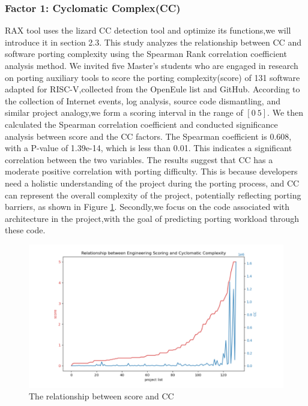 \documentclass[sigconf,screen,review,anonymous]{acmart}
\begin{document}
\subsubsection{Factor 1: Cyclomatic Complex(CC)}
RAX tool uses the lizard CC detection tool and optimize its functions,we will introduce it in section 2.3.
This study analyzes the relationship between CC and software porting complexity using the Spearman Rank correlation coefficient analysis method.
We invited five Master's students who are engaged in research on porting auxiliary tools to score the porting complexity(score) of 131 software adapted for RISC-V,collected from the OpenEule list and GitHub.
According to the collection of Internet events, log analysis, source code dismantling, and similar project analogy,we form a scoring interval in the range of $[0~5]$.
We then calculated the Spearman correlation coefficient and conducted significance analysis between score and the CC factors.
The Spearman coefficient is 0.608, with a P-value of 1.39e-14, which is less than 0.01.
This indicates a significant correlation between the two variables.
The results suggest that CC has a moderate positive correlation with porting difficulty.
This is because developers need a holistic understanding of the project during the porting process, and CC can represent the overall complexity of the project, potentially reflecting porting barriers, as shown in Figure \ref{fig:relationship}.
Secondly,we focus on the code associated with architecture in the project,with the goal of predicting porting workload through these code.

\begin{figure}
  \centering
  \includegraphics[width=\linewidth]{relationship.pdf}
  \caption{The relationship between score and CC}
  \label{fig:relationship}
\end{figure}
\end{document}
